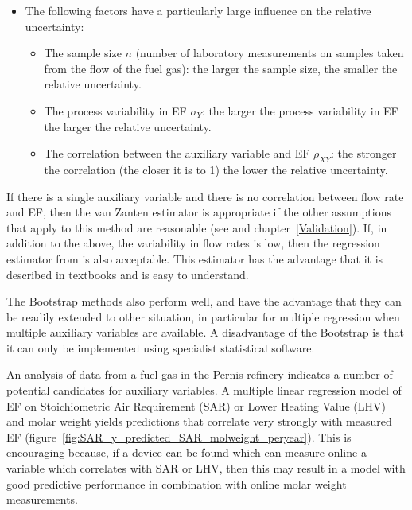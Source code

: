 \begin{itemize}
	\item The following factors have a particularly large influence on the relative uncertainty:
	\begin{itemize}
		\item The sample size $n$ (number of laboratory measurements on samples taken from the flow of the fuel gas): the larger the sample size, the smaller the relative uncertainty.
		\item The process variability in EF $\sigma_Y$: the larger the process variability in EF the larger the relative uncertainty.
		\item The correlation between the auxiliary variable and EF $\rho_{XY}$: the stronger the correlation (the closer it is to 1) the lower the relative uncertainty.
	\end{itemize}
\end{itemize}

If there is a single auxiliary variable and there is no correlation between flow rate and EF, then the van Zanten estimator is appropriate if the other assumptions that apply to this method are reasonable (see \citet{vanZanten} and chapter~\ref{Validation}).
If, in addition to the above, the variability in flow rates is low, then the regression estimator from \citet{Cochran77} is also acceptable. This estimator has the advantage that it is described in textbooks and is easy to understand.

The Bootstrap methods also perform well, and have the advantage that they can be readily extended to other situation, in particular for multiple regression when multiple auxiliary variables are available. A disadvantage of the Bootstrap is that it can only be implemented using specialist statistical software.

An analysis of data from a fuel gas in the Pernis refinery indicates a number of potential candidates for auxiliary variables. A multiple linear regression model of EF on Stoichiometric Air Requirement (SAR) or Lower Heating Value (LHV) and molar weight yields predictions that correlate very strongly with measured EF (figure~\ref{fig:SAR_y_predicted_SAR_molweight_peryear}). This is encouraging because, if a device can be found which can measure online a variable which correlates with SAR or LHV, then this may result in a model with good predictive performance in combination with online molar weight measurements.
